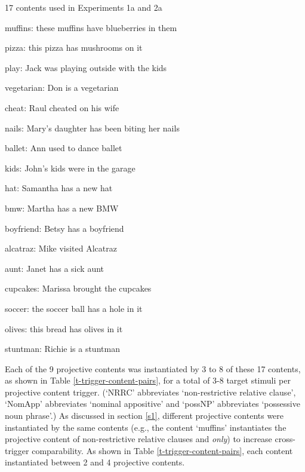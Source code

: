 \documentclass[11pt,fleqn]{article}
\newcommand{\6}{\mbox{$[\hspace*{-.6mm}[$}}
\newcommand{\9}{\mbox{$]\hspace*{-.6mm}]$}}
\begin{document}
\begin{exe}
\ex\label{contents} 17 contents used in Experiments 1a and 2a

\begin{enumerate}[topsep=0pt,itemsep=-.5mm]

\ex muffins: these muffins have blueberries in them

\ex pizza: this pizza has mushrooms on it

\ex play: Jack was playing outside with the kids

\ex vegetarian: Don is a vegetarian

\ex cheat: Raul cheated on his wife

\ex nails: Mary's daughter has been biting her nails

\ex ballet: Ann used to dance ballet

\ex kids: John's kids were in the garage

\ex hat: Samantha has a new hat

\ex bmw: Martha has a new BMW

\ex boyfriend: Betsy has a boyfriend

\ex alcatraz: Mike visited Alcatraz

\ex aunt: Janet has a sick aunt

\ex cupcakes: Marissa brought the cupcakes

\ex soccer: the soccer ball has a hole in it

\ex olives: this bread has olives in it

\ex stuntman: Richie is a stuntman

\end{enumerate}
\end{exe}

Each of the 9 projective contents was instantiated by 3 to 8 of these 17 contents, as shown in Table \ref{t-trigger-content-pairs}, for a total of 3-8 target stimuli per projective content trigger. (`NRRC' abbreviates `non-restrictive relative clause', `NomApp' abbreviates `nominal appositive' and `possNP' abbreviates `possessive noun phrase'.) As discussed in section \ref{s1}, different projective contents were instantiated by the same contents (e.g., the content `muffins' instantiates the projective content of non-restrictive relative clauses and {\em only}) to increase cross-trigger comparability. As shown in Table \ref{t-trigger-content-pairs}, each content instantiated between 2 and 4 projective contents.
\end{document}
